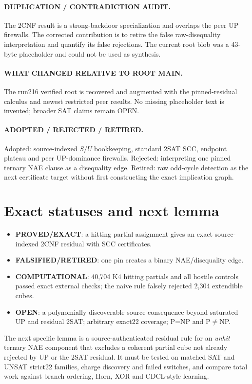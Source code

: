\documentclass[11pt]{article}
\newcommand{\PROVED}{\textbf{PROVED/EXACT}}
\newcommand{\COMP}{\textbf{COMPUTATIONAL}}
\newcommand{\FALSE}{\textbf{FALSIFIED/RETIRED}}
\newcommand{\OPEN}{\textbf{OPEN}}
\begin{document}
\paragraph{DUPLICATION / CONTRADICTION AUDIT.}
The 2CNF result is a strong-backdoor specialization and overlaps the peer UP
firewalls.  The corrected contribution is to retire the false raw-disequality
interpretation and quantify its false rejections.  The current root blob was a
43-byte placeholder and could not be used as synthesis.

\paragraph{WHAT CHANGED RELATIVE TO ROOT MAIN.}
The run216 verified root is recovered and augmented with the pinned-residual
calculus and newest restricted peer results.  No missing placeholder text is
invented; broader SAT claims remain OPEN.

\paragraph{ADOPTED / REJECTED / RETIRED.}
Adopted: source-indexed $S/U$ bookkeeping, standard 2SAT SCC, endpoint plateau
and peer UP-dominance firewalls.  Rejected: interpreting one pinned ternary NAE
clause as a disequality edge.  Retired: raw odd-cycle detection as the next
certificate target without first constructing the exact implication graph.

\section{Exact statuses and next lemma}
\begin{itemize}
\item \PROVED: a hitting partial assignment gives an exact source-indexed 2CNF
residual with SCC certificates.
\item \FALSE: one pin creates a binary NAE/disequality edge.
\item \COMP: 40,704 K4 hitting partials and all hostile controls passed exact
external checks; the naive rule falsely rejected 2,304 extendible cubes.
\item \OPEN: a polynomially discoverable source consequence beyond saturated
UP and residual 2SAT; arbitrary exact22 coverage; P=NP and P$\ne$NP.
\end{itemize}

The next specific lemma is a source-authenticated residual rule for an
\emph{unhit} ternary NAE component that excludes a coherent partial cube not
already rejected by UP or the 2SAT residual.  It must be tested on matched SAT
and UNSAT strict22 families, charge discovery and failed switches, and compare
total work against branch ordering, Horn, XOR and CDCL-style learning.

\end{document}
